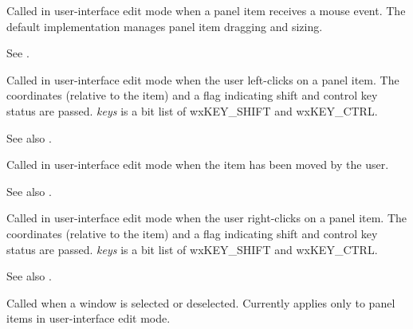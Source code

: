 

Called in user-interface edit mode when a panel item receives a mouse event.
The default implementation manages panel item dragging and sizing.

See .



Called in user-interface edit mode when the user left-clicks on a panel item.
The coordinates (relative to the item) and a flag indicating shift and control
key status are passed. {\it keys} is a bit list of wxKEY\_SHIFT and wxKEY\_CTRL.

See also .



Called in user-interface edit mode when the item has been moved by the user.

See also .



Called in user-interface edit mode when the user right-clicks on a panel item.
The coordinates (relative to the item) and a flag indicating shift and control
key status are passed. {\it keys} is a bit list of wxKEY\_SHIFT and wxKEY\_CTRL.

See also .



Called when a window is selected or deselected. Currently applies only to panel items
in user-interface edit mode.



